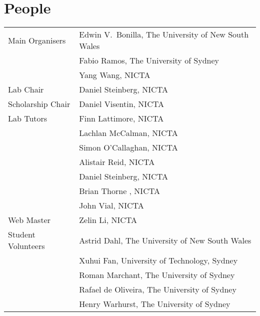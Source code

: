 {}
\section*{People}


\begin{tabular}{p{4.5cm}p{10cm}}
Main Organisers 
& Edwin V.~Bonilla, The University of New South Wales \\ [2mm]
& Fabio Ramos, The University of Sydney \\ [2mm]
& Yang Wang, NICTA  \\ [2mm]
Lab Chair
&
Daniel Steinberg, NICTA \\ [3mm]
Scholarship Chair
& 
Daniel Visentin, NICTA \\ [3mm]
Lab Tutors
&
Finn Lattimore,  NICTA \\ [2mm]
&  Lachlan McCalman, NICTA \\ [2mm]
& Simon O'Callaghan, NICTA \\ [2mm]
& Alistair Reid,  NICTA \\ [2mm]
& Daniel Steinberg, NICTA \\ [2mm]
& Brian Thorne , NICTA \\ [2mm]
& John Vial, NICTA  \\ [3mm]
Web Master 
&
Zelin Li, NICTA \\ [3mm]
Student Volunteers 
& Astrid Dahl, The University of New South Wales  \\ [2mm]
& Xuhui Fan, University of Technology, Sydney   \\ [2mm]
& Roman Marchant, The University of Sydney  \\ [2mm]
& Rafael de Oliveira, The University of Sydney  \\ [2mm]
& Henry Warhurst,  The University of Sydney  
\end{tabular}





